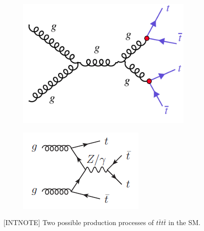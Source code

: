 \begin{figure}[H]
\begin{subfigure}{.5\textwidth}
  \centering
  \includegraphics[width=.8\linewidth]{figs/4tproduction1.png}
  \caption{}
  \label{fig:4tproduction1}
\end{subfigure}%
\begin{subfigure}{.5\textwidth}
  \centering
  \includegraphics[width=.8\linewidth]{figs/4tproduction2.png}
  \caption{}
  \label{fig:4tproduction2}
\end{subfigure}
\caption{[INTNOTE] Two possible production processes of $t\bar{t}t\bar{t}$ in the SM.}
\label{fig:FourTopProduction}
\end{figure}

